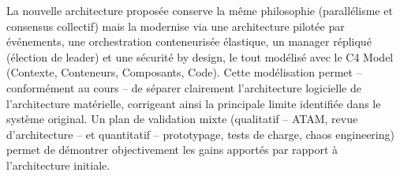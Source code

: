\documentclass[11pt,a4paper]{article}
\begin{document}
La nouvelle architecture proposée conserve la même philosophie (parallélisme et consensus collectif) mais la modernise via une architecture pilotée par événements, une orchestration conteneurisée élastique, un manager répliqué (élection de leader) et une sécurité by design, le tout modélisé avec le C4 Model (Contexte, Conteneurs, Composants, Code). Cette modélisation permet -- conformément au cours -- de séparer clairement l'architecture logicielle de l'architecture matérielle, corrigeant ainsi la principale limite identifiée dans le système original. Un plan de validation mixte (qualitatif -- ATAM, revue d'architecture -- et quantitatif -- prototypage, tests de charge, chaos engineering) permet de démontrer objectivement les gains apportés par rapport à l'architecture initiale.
\end{document}
